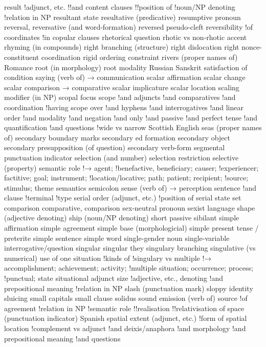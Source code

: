 result
!adjunct, etc.
!!and content clauses
!!position of
!noun/NP denoting
!relation in NP
resultant state
resultative (predicative)
resumptive pronoun
reversal, reversative (and word-formation)
reversed pseudo-cleft
reversibility
!of coordinates
!in copular clauses
rhetorical question
rhotic vs non-rhotic accent
rhyming (in compounds)
right branching (structure)
right dislocation
right nonce-constituent coordination
rigid ordering constraint
rivers (proper names of)
Romance
root (in morphology)
root modality
Russian
Sanskrit
satisfaction of condition
saying (verb of) → communication
scalar affirmation
scalar change
scalar comparison → comparative
scalar implicature
scalar location
scaling modifier (in NP)
scopal focus
scope
!and adjuncts
!and comparatives
!and coordination
!having scope over
!and hyphens
!and interrogatives
!and linear order
!and modality
!and negation
!and only
!and passive
!and perfect tense
!and quantification
!and questions
!wide vs narrow
Scottish English
seas (proper names of)
secondary boundary marks
secondary ed formation
secondary object
secondary presupposition (of question)
secondary verb-form
segmental punctuation indicator
selection (and number)
selection restriction
selective (property)
semantic role
!→ agent;
!benefactive, beneficiary; causer;
!experiencer; factitive; goal; instrument;
!location/locative; path; patient; recipient;
!source; stimulus; theme
semantics
semicolon
sense (verb of) → perception
sentence
!and clause
!terminal
!type
serial order (adjunct, etc.)
!position of
serial state
set comparison comparative, comparison
sex-neutral pronoun
sexist language
shape (adjective denoting)
ship (noun/NP denoting)
short passive
sibilant
simple affirmation
simple agreement
simple base (morphologicial)
simple present tense / preterite
simple sentence
simple word
single-gender noun
single-variable interrogative/question
singular
singular they
singulary branching
singulative (vs numerical) use of one
situation
!kinds of
!singulary vs multiple
!→ accomplishment; achievement; activity;
!multiple situation; occurrence; process;
!punctual; state
situational adjunct
size
!adjective, etc., denoting
!and prepositional meaning
!relation in NP
slash (punctuation mark)
sloppy identity
sluicing
small capitals
small clause
solidus
sound emission (verb of)
source
!of agreement
!relation in NP
!semantic role
!!realisation
!!relativisation of
space (punctuation indicator)
Spanish
spatial extent (adjunct, etc.)
!form of
spatial location
!complement vs adjunct
!and deixis/anaphora
!and morphology
!and prepositional meaning
!and questions
